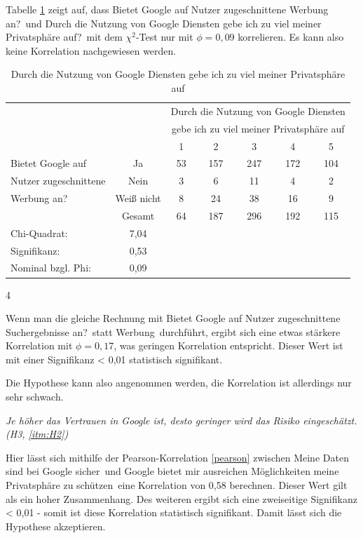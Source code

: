 Tabelle \ref{4sadsprivacy} zeigt auf, dass \glqq Bietet Google auf Nutzer zugeschnittene Werbung an?\grqq\ und \glqq Durch die Nutzung von Google Diensten gebe ich zu viel meiner Privatsphäre auf?\grqq\ mit dem $\chi^2$-Test nur mit $\phi = 0,09$ korrelieren. Es kann also keine Korrelation nachgewiesen werden.
\begin{table}
	\begin{tabular}[]{l c | c | c | c | c | c }
	& & \multicolumn{5}{c}{Durch die Nutzung von Google Diensten}\\
	& & \multicolumn{5}{c}{gebe ich zu viel meiner Privatsphäre auf}\\\hline
	& & 1 & 2 & 3 & 4 & 5\\\hline
	Bietet Google auf & Ja & 53 & 157 & 247 & 172 & 104 \\
	Nutzer zugeschnittene & Nein & 3 & 6 & 11 & 4 & 2 \\
	Werbung an? & Weiß nicht & 8 & 24 & 38 & 16 & 9 \\
	& Gesamt & 64 & 187 & 296 & 192 & 115\\ \hline \hline
	Chi-Quadrat: & 7,04 & & & & &\\
	Signifikanz: & 0,53 & & & & &\\
	Nominal bzgl. Phi: & 0,09&&&&&\\ \hline
	\end{tabular}
	\caption{Durch die Nutzung von Google Diensten gebe ich zu viel meiner Privatsphäre auf}\label{4sadsprivacy}
\end{table}4

Wenn man die gleiche Rechnung mit \glqq Bietet Google auf Nutzer zugeschnittene Suchergebnisse an?\grqq\ statt \glqq Werbung\grqq\ durchführt, ergibt sich eine etwas stärkere Korrelation mit $\phi = 0,17$, was geringen Korrelation entspricht. Dieser Wert ist mit einer Signifikanz < 0,01 statistisch signifikant.

Die Hypothese kann also angenommen werden, die Korrelation ist allerdings nur sehr schwach.

\textit{Je höher das Vertrauen in Google ist, desto geringer wird das Risiko eingeschätzt. (H3, \ref{itm:H2})}

Hier lässt sich mithilfe der Pearson-Korrelation \ref{pearson} zwischen \glqq Meine Daten sind bei Google sicher\grqq\ und \glqq Google bietet mir ausreichen Möglichkeiten meine Privatsphäre zu schützen\grqq\ eine Korrelation von 0,58 berechnen. Dieser Wert gilt als ein hoher Zusammenhang. Des weiteren ergibt sich eine zweiseitige Signifikanz < 0,01 - somit ist diese Korrelation statistisch signifikant. Damit lässt sich die Hypothese akzeptieren.


